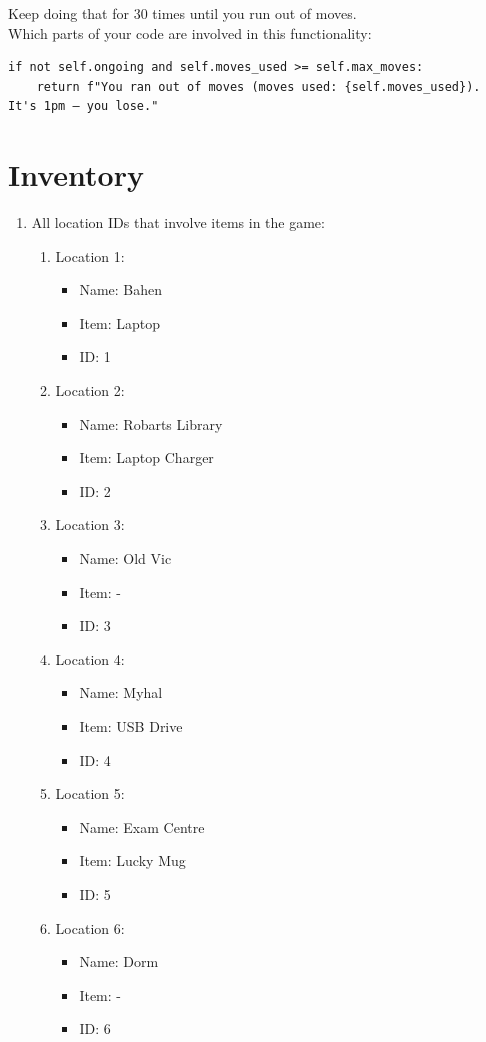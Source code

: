 \documentclass[11pt]{article}
\begin{document}
Keep doing that for 30 times until you run out of moves.\\

Which parts of your code are involved in this functionality:

\begin{verbatim}
if not self.ongoing and self.moves_used >= self.max_moves:
    return f"You ran out of moves (moves used: {self.moves_used}). It's 1pm — you lose."
\end{verbatim}

\section*{Inventory}

\begin{enumerate}
\item All location IDs that involve items in the game:
\begin{enumerate}
        \item Location 1:
    \begin{itemize}
    \item Name: Bahen
    \item Item: Laptop
    \item ID: 1
    \end{itemize}
        \item Location 2: 
    \begin{itemize}
    \item Name: Robarts Library
    \item Item: Laptop Charger
    \item ID: 2
    \end{itemize}
        \item Location 3:
    \begin{itemize}
    \item Name: Old Vic 
    \item Item: -
    \item ID: 3
    \end{itemize}
        \item Location 4:
    \begin{itemize}
    \item Name: Myhal
    \item Item: USB Drive
    \item ID: 4
    \end{itemize} 
        \item Location 5:
    \begin{itemize}
    \item Name: Exam Centre 
    \item Item: Lucky Mug
    \item ID: 5
    \end{itemize}
        \item Location 6:
    \begin{itemize}
    \item Name: Dorm 
    \item Item: -
    \item ID: 6
    \end{itemize}
\end{enumerate}



\end{enumerate}
\end{document}

